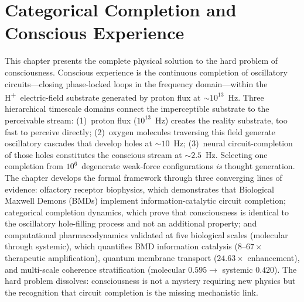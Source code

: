 
\providecommand{\Hplus}{H\textsuperscript{+}}
\providecommand{\Otwo}{O\textsubscript{2}}
\providecommand{\Ereality}{\mathbf{E}_{\text{reality}}}
\providecommand{\Ccat}{\mathcal{C}}
\providecommand{\Cdot}{\dot{C}}
\providecommand{\Hhole}{\mathcal{H}}
\providecommand{\Oreq}{\Omega_{\text{req}}}
\providecommand{\Ntilde}{\tilde{N}}
\providecommand{\nstates}{N_{\text{states}}}
\providecommand{\fO}{f_{O_2}}
\providecommand{\Ambi}{A(\omega)}
\providecommand{\PLV}{\text{PLV}}
\providecommand{\Rdrug}{R_{\text{drug,hole}}}

\chapter{Categorical Completion and Conscious Experience}
\label{ch:categorical_completion}

\begin{chapterabstract}
This chapter presents the complete physical solution to the hard problem of
consciousness.  Conscious experience is the continuous completion of oscillatory
circuits---closing phase-locked loops in the frequency domain---within the
\Hplus\ electric-field substrate generated by proton flux at ${\sim}10^{13}$~Hz.
Three hierarchical timescale domains connect the imperceptible substrate to
the perceivable stream: (1)~proton flux ($10^{13}$~Hz) creates the reality
substrate, too fast to perceive directly; (2)~oxygen molecules traversing this
field generate oscillatory cascades that develop holes at ${\sim}10$~Hz; (3)~neural
circuit-completion of those holes constitutes the conscious stream at
${\sim}2.5$~Hz.  Selecting one completion from $10^6$~degenerate weak-force
configurations \emph{is} thought generation.  The chapter develops the formal
framework through three converging lines of evidence: olfactory receptor
biophysics, which demonstrates that Biological Maxwell Demons (BMDs) implement
information-catalytic circuit completion; categorical completion dynamics, which
prove that consciousness is identical to the oscillatory hole-filling process
and not an additional property; and computational pharmacodynamics validated
at five biological scales (molecular through systemic), which quantifies
BMD information catalysis ($8$--$67\times$ therapeutic amplification), quantum
membrane transport ($24.63\times$ enhancement), and multi-scale coherence
stratification (molecular $0.595 \to$ systemic $0.420$).  The hard problem
dissolves: consciousness is not a mystery requiring new physics but the
recognition that circuit completion is the missing mechanistic link.
\end{chapterabstract}

